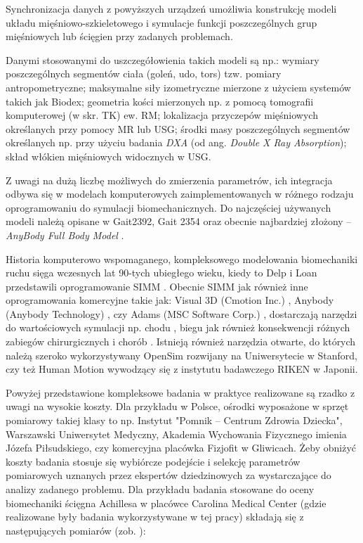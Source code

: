 Synchronizacja danych z powyższych urządzeń umożliwia konstrukcję modeli układu mięśniowo-szkieletowego i symulacje funkcji poszczególnych grup mięśniowych lub ścięgien przy zadanych problemach.

Danymi stosowanymi do uszczegółowienia takich modeli są np.: wymiary poszczególnych segmentów ciała (goleń, udo, tors) tzw. pomiary antropometryczne; maksymalne siły izometryczne mierzone z użyciem systemów takich jak Biodex; geometria kości mierzonych np. z pomocą tomografii komputerowej (w skr. TK) ew. RM; lokalizacja przyczepów mięśniowych określanych przy pomocy MR lub USG; środki masy poszczególnych segmentów określanych np. przy użyciu badania \textit{DXA} (od ang. \textit{Double X Ray Absorption}); skład włókien mięśniowych widocznych w USG.

Z uwagi na dużą liczbę możliwych do zmierzenia parametrów, ich integracja odbywa się w modelach komputerowych zaimplementowanych w różnego rodzaju oprogramowaniu do symulacji biomechanicznych. Do najczęściej używanych modeli należą opisane w \cite{John2013} Gait2392, Gait 2354 oraz obecnie najbardziej złożony -- \textit{AnyBody Full Body Model} \cite{Bassani2017}. 

Historia komputerowo wspomaganego, kompleksowego modelowania biomechaniki ruchu sięga wczesnych lat 90-tych ubiegłego wieku, kiedy to Delp i Loan przedstawili oprogramowanie SIMM \cite{Delp1990}. Obecnie SIMM jak również inne oprogramowania komercyjne takie jak: Visual 3D (Cmotion Inc.) \cite{Visual3D}, Anybody (Anybody Technology) \cite{AnyBody}, czy Adams (MSC Software Corp.) \cite{Adams}, dostarczają narzędzi do wartościowych symulacji np. chodu \cite{Steele2010}, biegu \cite{Hamner2010} jak również konsekwencji różnych zabiegów chirurgicznych \cite{Gomes2013} i chorób \cite{Shao2009}. Istnieją również narzędzia otwarte, do których należą szeroko wykorzystywany OpenSim \cite{Delp2007} rozwijany na Uniwersytecie w Stanford, czy też Human Motion \cite{Riken} wywodzący się z instytutu badawczego RIKEN w Japonii.

Powyżej przedstawione kompleksowe badania w praktyce realizowane są rzadko z uwagi na wysokie koszty. Dla przykładu w Polsce, ośrodki wyposażone w sprzęt pomiarowy takiej klasy to np. Instytut "Pomnik – Centrum Zdrowia Dziecka", Warszawski Uniwersytet Medyczny, Akademia Wychowania Fizycznego imienia Józefa Piłsudskiego, czy komercyjna placówka Fizjofit w Gliwicach. Żeby obniżyć koszty badania stosuje się wybiórcze podejście i selekcję parametrów pomiarowych uznanych przez ekspertów dziedzinowych za wystarczające do analizy zadanego problemu. Dla przykładu badania stosowane do oceny biomechaniki ścięgna Achillesa w placówce Carolina Medical Center (gdzie realizowane były badania wykorzystywane w tej pracy) składają się z następujących pomiarów (zob. \cite{CMC}):

